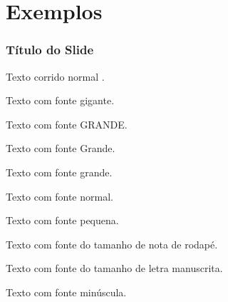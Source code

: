 \section{Exemplos}


\begin{frame}

    \frametitle{Título do Slide}

    Texto corrido normal .
    
    \begin{huge}
        Texto com fonte gigante.
    \end{huge}
    
    \begin{LARGE}
        Texto com fonte GRANDE.
    \end{LARGE}
        
    \begin{Large}
        Texto com fonte Grande.
    \end{Large}
    
    \begin{large}
        Texto com fonte grande.
    \end{large}
    
    \begin{normalsize}
        Texto com fonte normal.
    \end{normalsize}
        
    \begin{small}
        Texto com fonte pequena.
    \end{small}
        
    \begin{footnotesize}
        Texto com fonte do tamanho de nota de rodapé.
    \end{footnotesize}
    
    \begin{scriptsize}
        Texto com fonte do tamanho de letra manuscrita.
    \end{scriptsize}
        
    \begin{tiny}
        Texto com fonte minúscula.
    \end{tiny}        

\end{frame}


